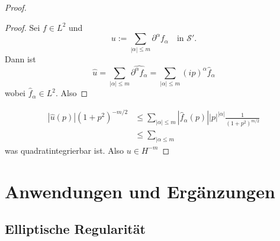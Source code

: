 \documentclass[
paper=a4,
bibtotocnumbered,
liststotocnumbered,
tablecaptionabove,
pointlessnumbers,
twoside,
openright,
10pt
]
{report}
\theoremstyle{definition}
\numberwithin{equation}{chapter}
\begin{document}
\begin{proof}
\begin{proof}
Sei $f\in L^2$ und
\begin{equation}
u:= \sum_{|\alpha|\le m} \partial^\alpha f_\alpha \quad \text{in } \mathcal S'.
\end{equation}
Dann ist
\begin{equation}
\hat u= \sum_{|\alpha|\le m} \widehat{\partial^\alpha f_\alpha} = \sum_{|\alpha|\le m} (ip)^\alpha \hat f_\alpha
\end{equation}
wobei $\hat f_\alpha\in L^2$. Also 
\end{proof}
\begin{align}
|\hat u(p)| (1+p^2)^{-m/2} &\le \sum_{|\alpha|\le m} |\hat f_\alpha (p)| |p|^{|\alpha|} \frac{1}{(1+p^2)^{m/2}} \\
&\le \sum_{|\alpha\le m} 
\end{align}
was quadratintegrierbar ist. Also $u\in H^{-m}$
\end{proof}
\chapter{Anwendungen und Ergänzungen}
\section{Elliptische Regularität}
\end{document}
